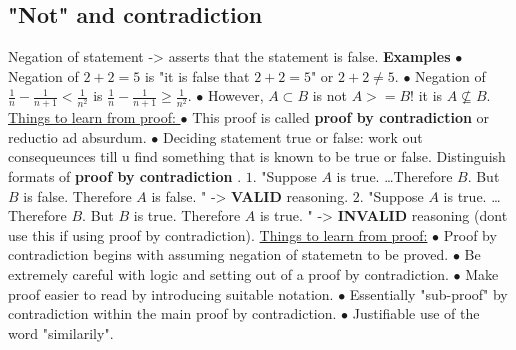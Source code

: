 \documentclass{article}
\begin{document}
\subsection{"Not" and contradiction}
Negation of statement -> asserts that the statement is false. 
\newline
\newline
{}
\newline
\newline
\textbf{Examples}
\newline
$\bullet $ Negation of $2 + 2 = 5$ is "it is false that $2 + 2 = 5$" or $2 + 2 \not = 5.$
\newline
$\bullet $ Negation of $\frac{1}{n} - \frac{1}{n + 1} < \frac{1}{n^2}$ is $\frac{1}{n} - \frac{1}{n + 1} \geq \frac{1}{n^2}.$
\newline
$\bullet $ However, $A \subset B$ is not $A >= B$! it is $A \not\subseteq B.$
\newline
{}
\newline
\newline
\underline{Things to learn from proof: }
\newline
$\bullet $ This proof is called \textbf{proof by contradiction } or reductio ad absurdum.
\newline
$\bullet $ Deciding statement true or false: work out consequeunces till u find something that is known to be true or false. 
\newline
\newline
Distinguish formats of \textbf{proof by contradiction }. 
\newline
$1.$ "Suppose $A$ is true. \dots Therefore $B$. But $B$ is false. Therefore $A$ is false. " -> \textbf{VALID} reasoning.
\newline
$2.$  "Suppose $A$ is true. \dots Therefore $B$. But $B$ is true. Therefore $A$ is true. " -> \textbf{INVALID} reasoning (dont use this if using proof by contradiction).
\newline
{}
\newline
\newline
\underline{Things to learn from proof:}
\newline
$\bullet $ Proof by contradiction begins with assuming negation of statemetn to be proved.
\newline
$\bullet $ Be extremely careful with logic and setting out of a proof by contradiction.
\newline
$\bullet $ Make proof easier to read by introducing suitable notation. 
\newline
$\bullet $ Essentially "sub-proof" by contradiction within the main proof by contradiction.
\newline
$\bullet $ Justifiable use of the word "similarily".
\newpage
\end{document}
